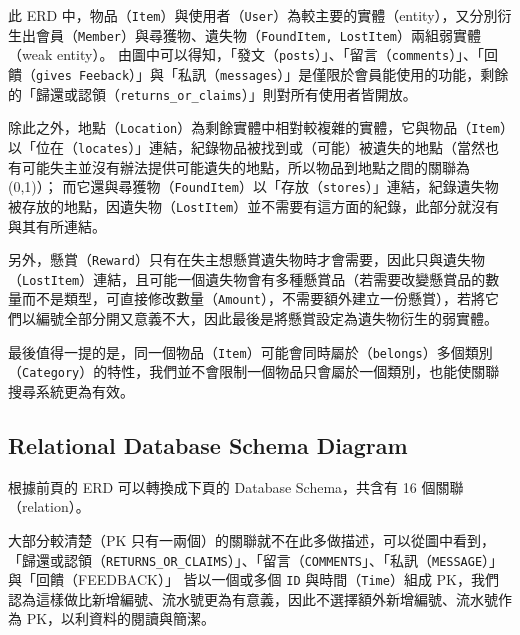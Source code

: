 \documentclass[12pt,a4paper]{article}
\begin{document}
\newpage
此 ERD 中，物品（\verb|Item|）與使用者（\verb|User|）為較主要的實體（entity），又分別衍生出會員（\verb|Member|）與尋獲物、遺失物（\verb|FoundItem, LostItem|）兩組弱實體（weak entity）。
由圖中可以得知，「發文（\verb|posts|）」、「留言（\verb|comments|）」、「回饋（\verb|gives Feeback|）」與「私訊（\verb|messages|）」是僅限於會員能使用的功能，剩餘的「歸還或認領（\verb|returns_or_claims|）」則對所有使用者皆開放。

除此之外，地點（\verb|Location|）為剩餘實體中相對較複雜的實體，它與物品（\verb|Item|）以「位在（\verb|locates|）」連結，紀錄物品被找到或（可能）被遺失的地點（當然也有可能失主並沒有辦法提供可能遺失的地點，所以物品到地點之間的關聯為 (0,1)）；
而它還與尋獲物（\verb|FoundItem|）以「存放（\verb|stores|）」連結，紀錄遺失物被存放的地點，因遺失物（\verb|LostItem|）並不需要有這方面的紀錄，此部分就沒有與其有所連結。

另外，懸賞（\verb|Reward|）只有在失主想懸賞遺失物時才會需要，因此只與遺失物（\verb|LostItem|）連結，且可能一個遺失物會有多種懸賞品（若需要改變懸賞品的數量而不是類型，可直接修改數量（\verb|Amount|），不需要額外建立一份懸賞），若將它們以編號全部分開又意義不大，因此最後是將懸賞設定為遺失物衍生的弱實體。

最後值得一提的是，同一個物品（\verb|Item|）可能會同時屬於（\verb|belongs|）多個類別（\verb|Category|）的特性，我們並不會限制一個物品只會屬於一個類別，也能使關聯搜尋系統更為有效。

\subsection{Relational Database Schema Diagram}
\label{subsection:schema}

根據前頁的 ERD 可以轉換成下頁的 Database Schema，共含有 16 個關聯（relation）。

大部分較清楚（PK 只有一兩個）的關聯就不在此多做描述，可以從圖中看到，「歸還或認領（\verb|RETURNS_OR_CLAIMS|）」、「留言（\verb|COMMENTS|」、「私訊（\verb|MESSAGE|）」與「回饋（FEEDBACK）」
皆以一個或多個 \verb|ID| 與時間（\verb|Time|）組成 PK，我們認為這樣做比新增編號、流水號更為有意義，因此不選擇額外新增編號、流水號作為 PK，以利資料的閱讀與簡潔。
\end{document}
